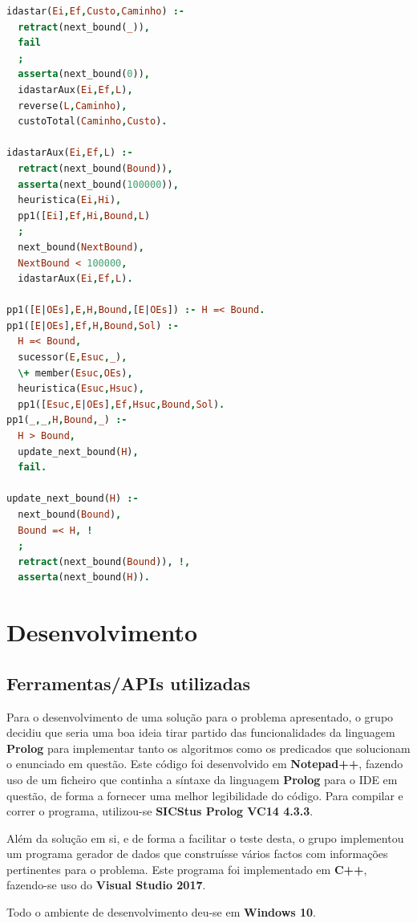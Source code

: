 \documentclass[a4paper]{article}
\begin{document}
\begin{lstlisting}[language=Prolog,xleftmargin=.2\textwidth]
idastar(Ei,Ef,Custo,Caminho) :-
  retract(next_bound(_)),
  fail
  ;
  asserta(next_bound(0)),
  idastarAux(Ei,Ef,L),
  reverse(L,Caminho),
  custoTotal(Caminho,Custo).

idastarAux(Ei,Ef,L) :-
  retract(next_bound(Bound)),
  asserta(next_bound(100000)),
  heuristica(Ei,Hi),
  pp1([Ei],Ef,Hi,Bound,L)
  ;
  next_bound(NextBound),
  NextBound < 100000,
  idastarAux(Ei,Ef,L).

pp1([E|OEs],E,H,Bound,[E|OEs]) :- H =< Bound.
pp1([E|OEs],Ef,H,Bound,Sol) :-
  H =< Bound,
  sucessor(E,Esuc,_),
  \+ member(Esuc,OEs),
  heuristica(Esuc,Hsuc),
  pp1([Esuc,E|OEs],Ef,Hsuc,Bound,Sol).
pp1(_,_,H,Bound,_) :-
  H > Bound,
  update_next_bound(H),
  fail.

update_next_bound(H) :-
  next_bound(Bound),
  Bound =< H, !
  ;
  retract(next_bound(Bound)), !,
  asserta(next_bound(H)).
\end{lstlisting}

\newpage

\section{Desenvolvimento}

\subsection{Ferramentas/APIs utilizadas} 

Para o desenvolvimento de uma solução para o problema apresentado, o grupo decidiu que seria uma boa ideia tirar partido das funcionalidades da linguagem \textbf{Prolog} para implementar tanto os algoritmos como os predicados que solucionam o enunciado em questão. Este código foi desenvolvido em \textbf{Notepad++}, fazendo uso de um ficheiro que continha a síntaxe da linguagem \textbf{Prolog} para o IDE em questão, de forma a fornecer uma melhor legibilidade do código. Para compilar e correr o programa, utilizou-se \textbf{SICStus Prolog VC14 4.3.3}.

Além da solução em si, e de forma a facilitar o teste desta, o grupo implementou um programa gerador de dados que construísse vários factos com informações pertinentes para o problema. Este programa foi implementado em \textbf{C++}, fazendo-se uso do \textbf{Visual Studio 2017}.

Todo o ambiente de desenvolvimento deu-se em \textbf{Windows 10}.
\end{document}
